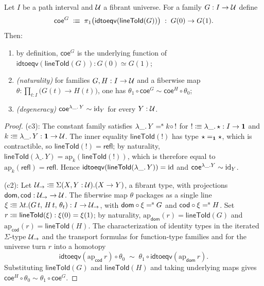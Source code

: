 \begin{lemma}\label{lem:coercion-laws}
	Let $I$ be a path interval and $\mathcal{U}$ a fibrant universe. For a family
	$G:I\to\mathcal{U}$ define
	\[
		\mathsf{coe}^G\;\mathrel{\vcentcolon\mspace{-1mu}\equiv}\;\pi_1\bigl(\mathsf{idtoeqv}(\mathsf{lineToId}(G))\bigr)\;:\;G(0)\to G(1).
	\]
	Then:
	\begin{enumerate}[noitemsep]
		\item[(c1)] by definition, $\mathsf{coe}^G$ is the underlying function of
		$\mathsf{idtoeqv}(\mathsf{lineToId}(G)):G(0)\simeq G(1)$;
		\item[(c2)] \emph{(naturality)} for families $G,H:I\to\mathcal{U}$ and a
		fiberwise map $\theta:\prod_{t:I}\bigl(G(t)\to H(t)\bigr)$, one has
		$\theta_1\circ\mathsf{coe}^G\sim\mathsf{coe}^H\circ\theta_0$;
		\item[(c3)] \emph{(degeneracy)} $\mathsf{coe}^{\lambda\_.\,Y}\sim\operatorname{id}_Y$
		for every $Y:\mathcal{U}$.
	\end{enumerate}
\end{lemma}
\begin{proof}
	(c3): The constant family satisfies $\lambda\_.\,Y\mathrel{=^\textup{s}} k\circ\,!$ for
	$!\mathrel{\vcentcolon\mspace{-1mu}\equiv}\lambda\_.\,\star:I\to\mathbf{1}$ and $k\mathrel{\vcentcolon\mspace{-1mu}\equiv}\lambda\_.\,Y:\mathbf{1}\to\mathcal{U}$.
	The inner equality $\mathsf{lineToId}(!)$ has type $\star=_{\mathbf{1}}\star$, which is
	contractible, so $\mathsf{lineToId}(!)=\mathsf{refl}$; by naturality,
	$\mathsf{lineToId}(\lambda\_.\,Y)=\mathrm{ap}_k(\mathsf{lineToId}(!))$, which
	is therefore equal to $\mathrm{ap}_k(\mathsf{refl})=\mathsf{refl}$.
	Hence $\mathsf{idtoeqv}(\mathsf{lineToId}(\lambda\_.\,Y))=\operatorname{id}$ and
	$\mathsf{coe}^{\lambda\_.Y}\sim\operatorname{id}_Y$.

	(c2): Let $\mathcal{U}_{\to}\mathrel{\vcentcolon\mspace{-1mu}\equiv}\Sigma(X,Y:\mathcal{U}).(X\to Y)$, a fibrant type,
	with projections $\mathsf{dom},\mathsf{cod}:\mathcal{U}_\to\to\mathcal{U}$. The fiberwise map
	$\theta$ packages as a single line
	$\xi\mathrel{\vcentcolon\mspace{-1mu}\equiv}\lambda t.(G\,t,\,H\,t,\,\theta_t):I\to\mathcal{U}_\to$, with
	$\mathsf{dom}\circ\xi\mathrel{=^\textup{s}} G$ and $\mathsf{cod}\circ\xi\mathrel{=^\textup{s}} H$. Set
	$r\mathrel{\vcentcolon\mspace{-1mu}\equiv}\mathsf{lineToId}(\xi):\xi(0)=\xi(1)$; by naturality,
	$\mathrm{ap}_{\mathsf{dom}}(r)=\mathsf{lineToId}(G)$ and
	$\mathrm{ap}_{\mathsf{cod}}(r)=\mathsf{lineToId}(H)$. The characterization of
	identity types in the iterated $\Sigma$-type $\mathcal{U}_\to$ and the transport formulas for
	function-type families and for the universe
	\citep[\S2.7, \S2.9, \S2.10]{HoTTBook} turn $r$ into a homotopy
	\[
		\mathsf{idtoeqv}(\mathrm{ap}_{\mathsf{cod}}\,r)\circ\theta_0
		\;\sim\;
		\theta_1\circ\mathsf{idtoeqv}(\mathrm{ap}_{\mathsf{dom}}\,r).
	\]
	Substituting $\mathsf{lineToId}(G)$ and $\mathsf{lineToId}(H)$ and taking underlying
	maps gives $\mathsf{coe}^H\circ\theta_0\sim\theta_1\circ\mathsf{coe}^G$.
\end{proof}

